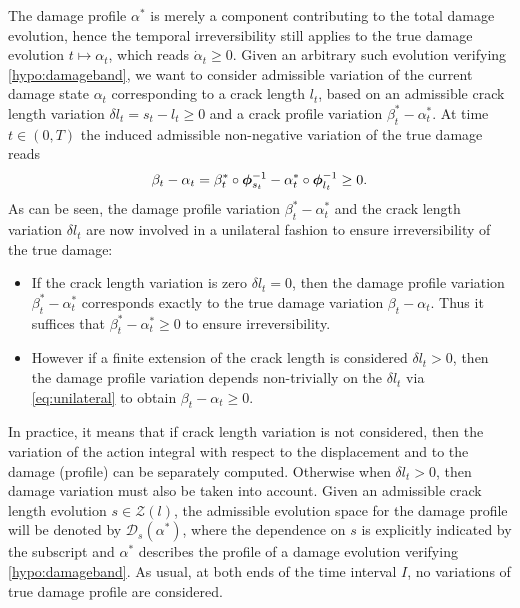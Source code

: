 The damage profile $\alpha^*$ is merely a component contributing to the total damage evolution, hence the temporal irreversibility still applies to the true damage evolution $t\mapsto\alpha_t$, which reads $\dot{\alpha}_t\geq 0$. Given an arbitrary such evolution verifying \cref{hypo:damageband}, we want to consider admissible variation of the current damage state $\alpha_t$ corresponding to a crack length $l_t$, based on an admissible crack length variation $\delta l_t=s_t-l_t\geq 0$ and a crack profile variation $\beta_t^*-\alpha_t^*$. At time $t\in(0,T)$ the induced admissible non-negative variation of the true damage reads
\begin{equation} \label{eq:unilateral}
\beta_t-\alpha_t=\beta_t^*\circ\philt_{s_t}^{-1}-\alpha_t^*\circ\philt_{l_t}^{-1}\geq 0.
\end{equation}
As can be seen, the damage profile variation $\beta_t^*-\alpha_t^*$ and the crack length variation $\delta l_t$ are now involved in a unilateral fashion to ensure irreversibility of the true damage:
\begin{itemize}
\item If the crack length variation is zero $\delta l_t=0$, then the damage profile variation $\beta_t^*-\alpha_t^*$ corresponds exactly to the true damage variation $\beta_t-\alpha_t$. Thus it suffices that $\beta_t^*-\alpha_t^*\geq 0$ to ensure irreversibility.
\item However if a finite extension of the crack length is considered $\delta l_t>0$, then the damage profile variation depends non-trivially on the $\delta l_t$ via \eqref{eq:unilateral} to obtain $\beta_t-\alpha_t\geq 0$.
\end{itemize}
In practice, it means that if crack length variation is not considered, then the variation of the action integral with respect to the displacement and to the damage (profile) can be separately computed. Otherwise when $\delta l_t>0$, then damage variation must also be taken into account. Given an admissible crack length evolution $s\in\mathcal{Z}(l)$, the admissible evolution space for the damage profile will be denoted by $\mathcal{D}_s(\alpha^*)$, where the dependence on $s$ is explicitly indicated by the subscript and $\alpha^*$ describes the profile of a damage evolution verifying \cref{hypo:damageband}. As usual, at both ends of the time interval $I$, no variations of true damage profile are considered.

